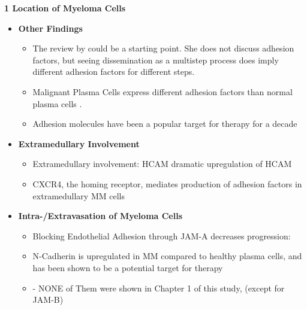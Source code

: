 \textbf{1 Location of Myeloma Cells}
\begin{itemize}
      \item \textbf{Other Findings}
            \begin{itemize}
                  \item The review by
                        \citet{zeissigTumourDisseminationMultiple2020} could be
                        a starting point. She does not discuss adhesion factors,
                        but seeing dissemination as a multistep process does
                        imply different adhesion factors for different steps.
                  \item Malignant Plasma Cells express different adhesion factors
                        than normal plasma cells \cite{cookRoleAdhesionMolecules1997, bouzerdanAdhesionMoleculesMultiple2022}.

                  \item Adhesion molecules have been a popular target for therapy for a decade \cite{nairChapterSixEmerging2012}
            \end{itemize}

      \item \textbf{Extramedullary Involvement}
            \begin{itemize}
                  \item Extramedullary involvement: HCAM dramatic upregulation of HCAM
                  \item CXCR4, the homing receptor, mediates production of
                        adhesion factors in extramedullary MM cells \cite{roccaroCXCR4RegulatesExtraMedullary2015}
            \end{itemize}

      \item \textbf{Intra-/Extravasation of Myeloma Cells}
            \begin{itemize}
                  \item Blocking Endothelial Adhesion through JAM-A decreases progression: \cite{solimandoHaltingViciousCycle2020}
                  \item N-Cadherin is upregulated in MM compared to healthy plasma cells, and has been shown to be a potential target for therapy \cite{mrozikTherapeuticTargetingNcadherin2015}
                  \item - NONE of Them were shown in Chapter 1 of this study, (except for JAM-B)
            \end{itemize}


\end{itemize}

